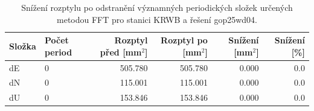 \begin{table}[htbp]
\caption{Snížení rozptylu po odstranění významných periodických složek určených metodou FFT pro stanici KRWB a řešení gop25wd04.}
\label{tab:gop25wd04_stcd_krwb_detr_weighted_1seg_spectral_fft_variance_reduction}
\begin{tabular}{llrrrr}
\toprule
Složka & Počet period & Rozptyl před [mm$^2$] & Rozptyl po [mm$^2$] & Snížení [mm$^2$] & Snížení [\%] \\
\midrule
dE & 0 & 505.780 & 505.780 & 0.000 & 0.0 \\
dN & 0 & 115.001 & 115.001 & 0.000 & 0.0 \\
dU & 0 & 153.846 & 153.846 & 0.000 & 0.0 \\
\bottomrule
\end{tabular}
\end{table}
